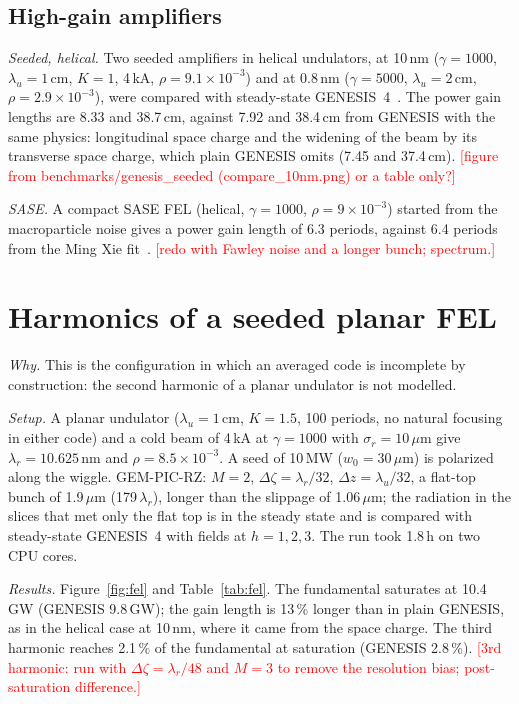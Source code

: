 \documentclass[aps,prab,reprint,floatfix,superscriptaddress,amsmath,amssymb]{revtex4-2}
\newcommand{\todo}[1]{\textcolor{red}{[#1]}}
\begin{document}
\subsection{High-gain amplifiers}\label{sec:helical}

\emph{Seeded, helical.} Two seeded amplifiers in helical undulators, at 10\,nm ($\gamma = 1000$, $\lambda_u = 1$\,cm, $K = 1$, 4\,kA, $\rho = 9.1\times10^{-3}$) and at 0.8\,nm ($\gamma = 5000$, $\lambda_u = 2$\,cm, $\rho = 2.9\times10^{-3}$), were compared with steady-state GENESIS~4~\cite{GEMPICRZ}. The power gain lengths are 8.33 and 38.7\,cm, against 7.92 and 38.4\,cm from GENESIS with the same physics: longitudinal space charge and the widening of the beam by its transverse space charge, which plain GENESIS omits (7.45 and 37.4\,cm). \todo{figure from benchmarks/genesis\_seeded (compare\_10nm.png) or a table only?}

\emph{SASE.} A compact SASE FEL (helical, $\gamma = 1000$, $\rho = 9\times10^{-3}$) started from the macroparticle noise gives a power gain length of 6.3 periods, against 6.4 periods from the Ming Xie fit~\cite{Xie1995}. \todo{redo with Fawley noise and a longer bunch; spectrum.}

\section{Harmonics of a seeded planar FEL}\label{sec:harm}

\emph{Why.} This is the configuration in which an averaged code is incomplete by construction: the second harmonic of a planar undulator is not modelled.

\emph{Setup.} A planar undulator ($\lambda_u = 1$\,cm, $K = 1.5$, 100 periods, no natural focusing in either code) and a cold beam of 4\,kA at $\gamma = 1000$ with $\sigma_r = 10\,\mu$m give $\lambda_r = 10.625$\,nm and $\rho = 8.5\times10^{-3}$. A seed of 10\,MW ($w_0 = 30\,\mu$m) is polarized along the wiggle. GEM-PIC-RZ: $M = 2$, $\Delta\zeta = \lambda_r/32$, $\Delta z = \lambda_u/32$, a flat-top bunch of 1.9\,$\mu$m (179\,$\lambda_r$), longer than the slippage of 1.06\,$\mu$m; the radiation in the slices that met only the flat top is in the steady state and is compared with steady-state GENESIS~4 with fields at $h = 1, 2, 3$. The run took 1.8\,h on two CPU cores.

\emph{Results.} Figure~\ref{fig:fel} and Table~\ref{tab:fel}. The fundamental saturates at 10.4\,GW (GENESIS 9.8\,GW); the gain length is 13\,\% longer than in plain GENESIS, as in the helical case at 10\,nm, where it came from the space charge. The third harmonic reaches 2.1\,\% of the fundamental at saturation (GENESIS 2.8\,\%). \todo{3rd harmonic: run with $\Delta\zeta = \lambda_r/48$ and $M = 3$ to remove the resolution bias; post-saturation difference.}
\end{document}
